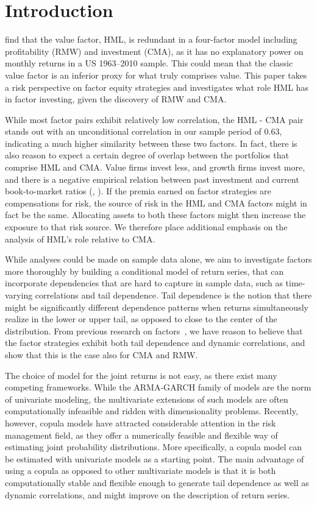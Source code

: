 \section{Introduction}
\textcite{FF2015} find that the value factor, HML, is redundant in a four-factor model including profitability (RMW) and investment (CMA), as it has no explanatory power on monthly returns in a US 1963–2010 sample. This could mean that the classic value factor is an inferior proxy for what truly comprises value. This paper takes a risk perspective on factor equity strategies and investigates what role HML has in factor investing, given the discovery of RMW and CMA. 

While most factor pairs exhibit relatively low correlation, the HML - CMA pair stands out with an unconditional correlation in our sample period of 0.63, indicating a much higher similarity between these two factors. In fact, there is also reason to expect a certain degree of overlap between the portfolios that comprise HML and CMA. Value firms invest less, and growth firms invest more, and there is a negative empirical relation between past investment and current book-to-market ratios (\textcite{Zhang2005}, \textcite{AndersonGarciaFeijoo2006}). If the premia earned on factor strategies are compensations for risk, the source of risk in the HML and CMA factors might in fact be the same. Allocating assets to both these factors might then increase the exposure to that risk source. We therefore place additional emphasis on the analysis of HML's role relative to CMA.

While analyses could be made on sample data alone, we aim to investigate factors more thoroughly by building a conditional model of return series, that can incorporate dependencies that are hard to capture in sample data, such as time-varying correlations and tail dependence. Tail dependence is the notion that there might be significantly different dependence patterns when returns simultaneously realize in the lower or upper tail, as opposed to close to the center of the distribution. From previous research on factors~\autocite{ChristoffersenLanglois2013}, we have reason to believe that the factor strategies exhibit both tail dependence and dynamic correlations, and show that this is the case also for CMA and RMW.

The choice of model for the joint returns is not easy, as there exist many competing frameworks. While the ARMA-GARCH family of models are the norm of univariate modeling, the multivariate extensions of such models are often computationally infeasible and ridden with dimensionality problems. Recently, however, copula models have attracted considerable attention in the risk management field, as they offer a numerically feasible and flexible way of estimating joint probability distributions. More specifically, a copula model can be estimated with univariate models as a starting point. The main advantage of using a copula as opposed to other multivariate models is that it is both computationally stable and flexible enough to generate tail dependence as well as dynamic correlations, and might improve on the description of return series. 

